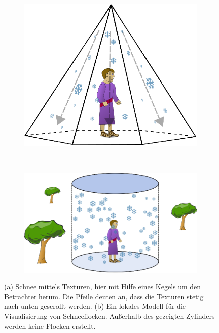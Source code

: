 \begin{figure}[h]
	\begin{subfigure}[t]{0.4\textwidth}
		\centering
		\includegraphics[width=\textwidth]{images/snow_double_cone}
                \caption{}
\label{fig:introduction_snow_double_cone}
	\end{subfigure}
~
	\begin{subfigure}[t]{0.6\textwidth}
		\centering
		\includegraphics[width=\textwidth]{images/particle_cylinder}
                \caption{}
\label{fig:introduction_particle_cylinder}
	\end{subfigure}
	\caption{(a) Schnee mittels Texturen, hier mit Hilfe eines Kegels um den Betrachter herum. Die Pfeile deuten an, dass die Texturen stetig nach unten gescrollt werden. (b) Ein lokales Modell für die Visualisierung von Schneeflocken. Außerhalb des gezeigten Zylinders werden keine Flocken erstellt.}
\end{figure}

